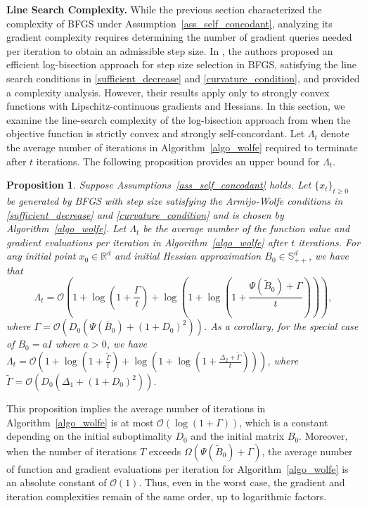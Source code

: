 \documentclass[11pt,letterpaper]{article}
\newcommand\0{{\Vector{0}}}
\newcommand\1{{\Vector{1}}}
\newtheorem{proposition}[theorem]{Proposition}
\numberwithin{assumption}{section}
\numberwithin{definition}{section}
\numberwithin{theorem}{section}
\numberwithin{remark}{section}
\begin{document}
\noindent\textbf{Line Search Complexity.}
While the previous section characterized the  complexity of BFGS under Assumption~\ref{ass_self_concodant}, analyzing its gradient complexity requires determining the number of gradient queries needed per iteration to obtain an admissible step size. In \cite{qiujiang2024quasinewton}, the authors proposed an efficient log-bisection approach for step size selection in BFGS, satisfying the line search conditions in \eqref{sufficient_decrease} and \eqref{curvature_condition}, and provided a complexity analysis. However, their results apply only to strongly convex functions with Lipschitz-continuous gradients and Hessians. In this section, we examine the line-search complexity of the log-bisection approach from \cite{qiujiang2024quasinewton} when the objective function is strictly convex and strongly self-concordant. Let $\Lambda_t$ denote the average number of iterations in Algorithm~\ref{algo_wolfe} required to terminate after $t$ iterations. The following proposition provides an upper bound for $\Lambda_t$.%

\begin{proposition}\label{prop:line_search}
Suppose Assumptions~\ref{ass_self_concodant} holds. Let $\{x_t\}_{t\geq 0}$ be generated by BFGS  with step size satisfying the Armijo-Wolfe conditions in \eqref{sufficient_decrease} and \eqref{curvature_condition} and is chosen by Algorithm~\ref{algo_wolfe}. Let $\Lambda_t$ be the average number of the function value and gradient evaluations per iteration in Algorithm~\ref{algo_wolfe} after $t$ iterations. For any initial point $x_0 \!\in\! \mathbb{R}^{d}$ and initial Hessian approximation $B_0\! \in\! \mathbb{S}^d_{++}$,  we have that
\begin{equation*}
    \Lambda_t = \mathcal{O}\left( 1 + \log\left(1 + \frac{\Gamma}{t}\right) + \log\left(1 + \log( 1 + \frac{\Psi(\tilde{B}_{0}) + \Gamma}{t})\right)\right),
\end{equation*}
where $\Gamma = \mathcal{O}(D_0(\Psi(\bar{B}_{0}) + (1 + D_0)^2))$. As a corollary, for the special case of $B_0 = a I$ where $a > 0$, we have $\Lambda_t = \mathcal{O}( 1 + \log(1 + \frac{\tilde{\Gamma}}{t}) + \log(1 + \log( 1 + \frac{\Delta_2 + \tilde{\Gamma}}{t})))$, where $\tilde{\Gamma} = \mathcal{O}\left(D_0(\Delta_1 + (1 + D_0)^2)\right)$. 
\end{proposition}

This proposition implies the average number of iterations in Algorithm~\ref{algo_wolfe} is at most $\mathcal{O}(\log{(1 + \Gamma)})$, which is a constant depending on the initial suboptimality $D_0$ and the initial matrix $B_0$. Moreover, when the number of iterations $T$ exceeds $\Omega(\Psi(\tilde{B}_{0}) + \Gamma)$, the average number of function  and gradient evaluations per iteration for Algorithm~\ref{algo_wolfe} is an absolute constant of $\mathcal{O}(1)$. Thus, even in the worst case, the gradient and iteration complexities remain of the same order, up to logarithmic factors.
\end{document}
